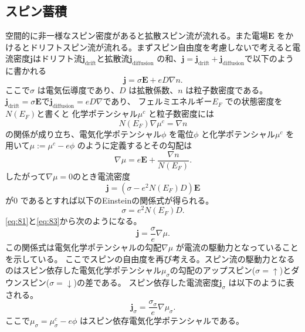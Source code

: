 \documentclass[dvipdfmx,11pt]{jsreport}
\numberwithin{equation}{chapter}
\numberwithin{table}{chapter}
\begin{document}
\subsection{スピン蓄積}
空間的に非一様なスピン密度があると拡散スピン流が流れる。また電場$\bm{E}$ をかけるとドリフトスピン流が流れる。まずスピン自由度を考慮しないで考えると電流密度$\bm{j}$はドリフト流$\bm{j}_\text{drift} $と拡散流$\bm{j}_\text{diffusion} $ の和、$\bm{j}=\bm{j}_\text{drift} +\bm{j}_\text{diffusion} $で以下のように書かれる
\begin{equation}
\label{eq:79}
	\bm{j}=\sigma \bm{E}+eD\nabla n
.\end{equation}
ここで$\sigma$ は電気伝導度であり、$D$ は拡散係数、$n$ は粒子数密度である。
$\bm{j}_\text{drift} =\sigma \bm{E}$で$\bm{j}_\text{diffusion} =eD\nabla $であり、
フェルミエネルギー$E_F$ での状態密度を$N(E_F)$と書くと 化学ポテンシャル$\mu^{c}$ と粒子数密度には
\begin{equation}
\label{eq:80}
	N(E_F)\nabla \mu^{c}=\nabla n
\end{equation}
の関係が成り立ち、電気化学ポテンシャル$\phi$ を電位$\phi$ と化学ポテンシャル$\mu^{c}$ を用いて$\mu:=\mu^{c}-e\phi$ のように定義するとその勾配は
\begin{equation}
\label{eq:81}
	\nabla \mu = e\bm{E}+\frac{\nabla n}{N(E_F)}
.\end{equation}
したがって$\nabla \mu = 0$のとき電流密度
\begin{equation}
\label{eq:82}
	\bm{j}=(\sigma-e^2N(E_F)D)\bm{E}
\end{equation}
が$0$ であるとすれば以下のEinsteinの関係式が得られる。
\begin{equation}
\label{eq:83}
	\sigma=e^2N(E_F)D
.\end{equation}
\eqref{eq:81}と\eqref{eq:83}から次のようになる。
\begin{equation}
\label{eq:84}
	\bm{j}=\frac{\sigma}{e}\nabla \mu
.\end{equation}
この関係式は電気化学ポテンシャルの勾配$\nabla \mu$ が電流の駆動力となっていることを示している。
ここでスピンの自由度を再び考える。スピン流の駆動力となるのはスピン依存した電気化学ポテンシャル$\mu_{\sigma}$の勾配のアップスピン($\sigma=\uparrow$)とダウンスピン($\sigma=\downarrow$)の差である。
スピン依存した電流密度$\bm{j}_{\sigma}$ は以下のように表される。
\begin{equation}
\label{eq:85}
	\bm{j}_{\sigma}=\frac{\sigma_{\sigma}}{e}\nabla \mu_{\sigma}
.\end{equation}
ここで$\mu_\sigma= \mu_{\sigma}^{c}-e\phi$ はスピン依存電気化学ポテンシャルである。
\end{document}
